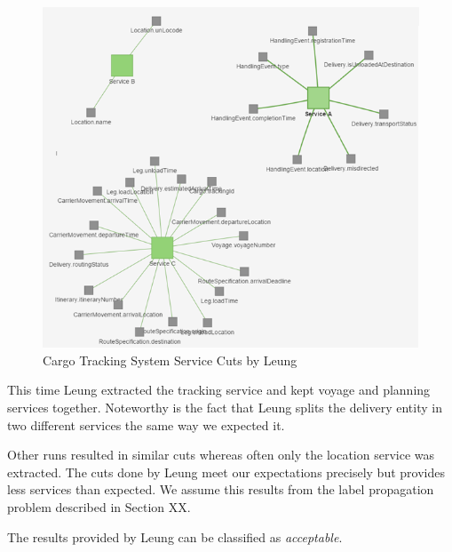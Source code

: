\begin{figure}[H]
	\includegraphics[scale=0.9]{images/leung_tracking.png}
	\caption{Cargo Tracking System Service Cuts by Leung}
	\label{fig:dddleungTracking}
\end{figure}

This time Leung extracted the tracking service and kept voyage and planning services together. Noteworthy is the fact that Leung splits the delivery entity in two different services the same way we expected it. 

Other runs resulted in similar cuts whereas often only the location service was extracted. The cuts done by Leung meet our expectations precisely but provides less services than expected. We assume this results from the label propagation problem described in Section XX. 

The results provided by Leung can be classified as \textit{acceptable}.










